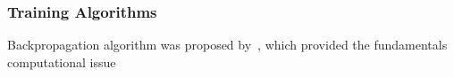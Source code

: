 \subsubsection{Training Algorithms}
Backpropagation algorithm was proposed by~\citet{werbos1975beyond}, which provided the fundamentals computational issue